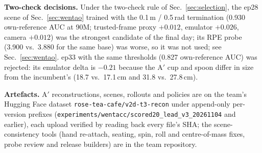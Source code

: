 \textbf{Two-check decisions.} Under the two-check rule of Sec.~\ref{sec:selection}, the ep28 scene
of Sec.~\ref{sec:wentao} trained with the 0.1\,m / 0.5\,rad termination (0.930 own-reference AUC
at 90M; trusted-frame proxy $+0.012$, emulator $+0.026$, camera $+0.012$) was the strongest
candidate of the final day; its RPE probe (3.900 vs.\ 3.880 for the same base) was worse, so it was
not used; see Sec.~\ref{sec:wentao}. ep33 with
the same thresholds (0.827 own-reference AUC) was rejected: its emulator delta is $-0.21$ because
the A$'$ cup and spoon differ in size from the incumbent's (18.7 vs.\ 17.1\,cm and 31.8 vs.\
27.8\,cm).

\textbf{Artefacts.} A$'$ reconstructions, scenes, rollouts and policies are on the team's
Hugging Face dataset \texttt{rose-tea-cafe/v2d-t3-recon} under append-only per-version prefixes
(\texttt{experiments/wentacc/}\allowbreak\texttt{scored20\_lead\_v3\_20261104} and earlier), each upload verified by
reading back every file's SHA; the scene-consistency tools (hand re-attach, seating, spin, roll
and centre-of-mass fixes, probe review and release builders) are in the team repository.

